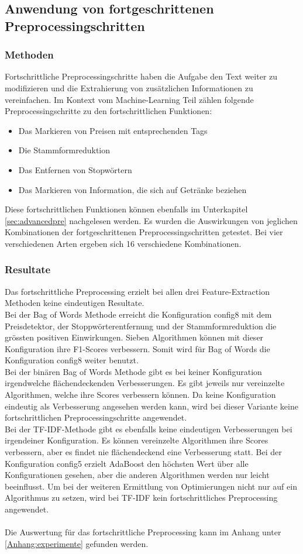 \subsection{Anwendung von fortgeschrittenen Preprocessingschritten}
\subsubsection{Methoden}
Fortschrittliche Preprocessingschritte haben die Aufgabe den Text weiter zu modifizieren und die Extrahierung von zusätzlichen Informationen zu vereinfachen.
Im Kontext vom Machine-Learning Teil zählen folgende Preprocessingschritte zu den fortschrittlichen Funktionen:
\begin{itemize}
	\item Das Markieren von Preisen mit entsprechenden Tags
	\item Die Stammformreduktion
	\item Das Entfernen von Stopwörtern
	\item Das Markieren von Information, die sich auf Getränke beziehen
\end{itemize}
Diese fortschrittlichen Funktionen können ebenfalls im Unterkapitel \ref{sec:advancedpre} nachgelesen werden.
Es wurden die Auswirkungen von jeglichen Kombinationen der fortgeschrittenen Preprocessingschritten getestet.
Bei vier verschiedenen Arten ergeben sich 16 verschiedene Kombinationen.
\subsubsection{Resultate}
Das fortschrittliche Preprocessing erzielt bei allen drei Feature-Extraction Methoden keine eindeutigen Resultate.\\
Bei der \glqq Bag of Words\grqq{} Methode erreicht die Konfiguration \glqq config8\grqq{} mit dem Preisdetektor, der Stoppwörterentfernung und der Stammformreduktion die grössten positiven Einwirkungen.
Sieben Algorithmen können mit dieser Konfiguration ihre F1-Scores verbessern.
Somit wird für \glqq Bag of Words\grqq{} die Konfiguration \glqq config8\grqq{} weiter benutzt.\\
Bei der binären \glqq Bag of Words\grqq{} Methode gibt es bei keiner Konfiguration irgendwelche flächendeckenden Verbesserungen.
Es gibt jeweils nur vereinzelte Algorithmen, welche ihre Scores verbessern können.
Da keine Konfiguration eindeutig als Verbesserung angesehen werden kann, wird bei dieser Variante keine fortschrittlichen Preprocessingschritte angewendet.\\
Bei der TF-IDF-Methode gibt es ebenfalls keine eindeutigen Verbesserungen bei irgendeiner Konfiguration.
Es können vereinzelte Algorithmen ihre Scores verbessern, aber es findet nie flächendeckend eine Verbesserung statt.
Bei der Konfiguration \glqq config5\grqq{} erzielt AdaBoost den höchsten Wert über alle Konfigurationen gesehen, aber die anderen Algorithmen werden nur leicht beeinflusst.
Um bei der weiteren Ermittlung von Optimierungen nicht nur auf ein Algorithmus zu setzen, wird bei TF-IDF kein fortschrittliches Preprocessing angewendet.
\\\\
Die Auswertung für das fortschrittliche Preprocessing kann im Anhang unter \cref{Anhang:experimente} gefunden werden.
